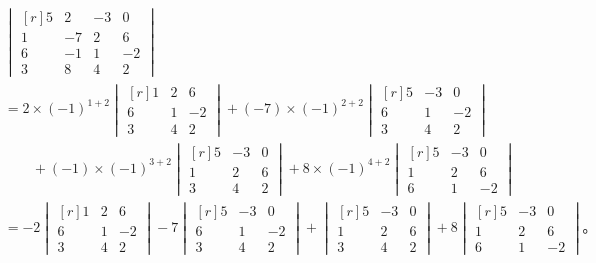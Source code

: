 \jie
\shangyihang\begin{align*}
    & \begin{vmatrix*}[r]
        5 & 2  & -3 & 0 \\
        1 & -7 & 2  & 6 \\
        6 & -1 & 1  & -2 \\
        3 & 8  & 4  & 2
    \end{vmatrix*} \\
    &= 2 \times (-1)^{1+2} \begin{vmatrix*}[r]
            1 & 2  & 6 \\
            6 & 1  & -2 \\
            3 & 4  & 2
        \end{vmatrix*}
    + (-7) \times (-1)^{2+2} \begin{vmatrix*}[r]
            5 & -3 & 0 \\
            6 & 1  & -2 \\
            3 & 4  & 2
        \end{vmatrix*} \\
    &\qquad + (-1) \times (-1)^{3+2} \begin{vmatrix*}[r]
            5 & -3 & 0 \\
            1 & 2  & 6 \\
            3 & 4  & 2
        \end{vmatrix*}
    + 8 \times (-1)^{4+2} \begin{vmatrix*}[r]
            5 & -3 & 0 \\
            1 & 2  & 6 \\
            6 & 1  & -2
        \end{vmatrix*} \\
    &= -2 \begin{vmatrix*}[r]
            1 & 2  & 6 \\
            6 & 1  & -2 \\
            3 & 4  & 2
        \end{vmatrix*}
    - 7 \begin{vmatrix*}[r]
            5 & -3 & 0 \\
            6 & 1  & -2 \\
            3 & 4  & 2
        \end{vmatrix*}
    +   \begin{vmatrix*}[r]
            5 & -3 & 0 \\
            1 & 2  & 6 \\
            3 & 4  & 2
        \end{vmatrix*}
    + 8 \begin{vmatrix*}[r]
            5 & -3 & 0 \\
            1 & 2  & 6 \\
            6 & 1  & -2
        \end{vmatrix*} \text{。}
\end{align*}


